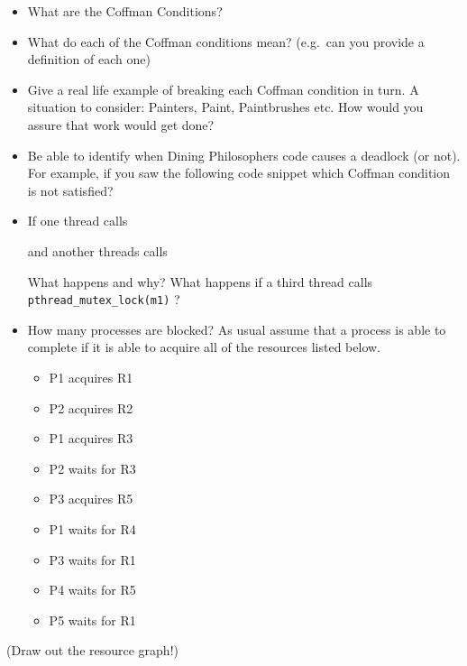 \begin{itemize}
\item
  What are the Coffman Conditions?
\item
  What do each of the Coffman conditions mean? (e.g.~can you provide a
  definition of each one)
\item
  Give a real life example of breaking each Coffman condition in turn. A
  situation to consider: Painters, Paint, Paintbrushes etc. How would
  you assure that work would get done?
\item
  Be able to identify when Dining Philosophers code causes a deadlock
  (or not). For example, if you saw the following code snippet which
  Coffman condition is not satisfied?

\begin{Shaded}
\begin{Highlighting}[]
\NormalTok{\}}
\end{Highlighting}
\end{Shaded}
\item
  If one thread calls

\begin{Shaded}
\begin{Highlighting}[]
\end{Highlighting}
\end{Shaded}

  and another threads calls

\begin{Shaded}
\begin{Highlighting}[]
\end{Highlighting}
\end{Shaded}

  What happens and why? What happens if a third thread calls
  \texttt{pthread\_mutex\_lock(m1)} ?
\item
  How many processes are blocked? As usual assume that a process is able
  to complete if it is able to acquire all of the resources listed
  below.

  \begin{itemize}
  \tightlist
  \item
    P1 acquires R1
  \item
    P2 acquires R2
  \item
    P1 acquires R3
  \item
    P2 waits for R3
  \item
    P3 acquires R5
  \item
    P1 waits for R4
  \item
    P3 waits for R1
  \item
    P4 waits for R5
  \item
    P5 waits for R1
  \end{itemize}
\end{itemize}

(Draw out the resource graph!)
